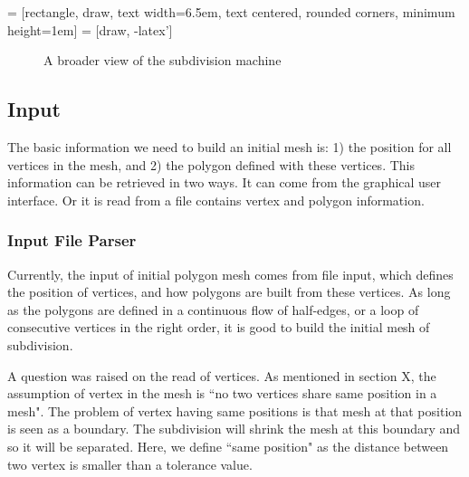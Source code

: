 \documentclass[12pt]{article}
\begin{document}
 = [rectangle, draw, 
    text width=6.5em, text centered, rounded corners, minimum height=1em]
 = [draw, -latex']

\begin{figure}[ht]
  \centering    
    \caption{A broader view of the subdivision machine}
    \label{figure:birdView}
\end{figure}

\subsection{Input}
The basic information we need to build an initial mesh is: 1) the position for all vertices in the mesh, and 2) the polygon defined with these vertices.
This information can be retrieved in two ways. It can come from the graphical user interface. Or it is read from a file contains vertex and polygon information.
\subsubsection{Input File Parser}
Currently, the input of initial polygon mesh comes from file input, which defines the position of vertices, and how polygons are built from these vertices. As long as the polygons are defined in a continuous flow of half-edges, or a loop of consecutive vertices in the right order, it is good to build the initial mesh of subdivision.

A question was raised on the read of vertices. As mentioned in section X, the assumption of vertex in the mesh is ``no two vertices share same position in a mesh". The problem of vertex having same positions is that mesh at that position is seen as a boundary.  The subdivision will shrink the mesh at this boundary and so it will be separated. Here, we define ``same position" as the distance between two vertex is smaller than a tolerance value.
\end{document}
